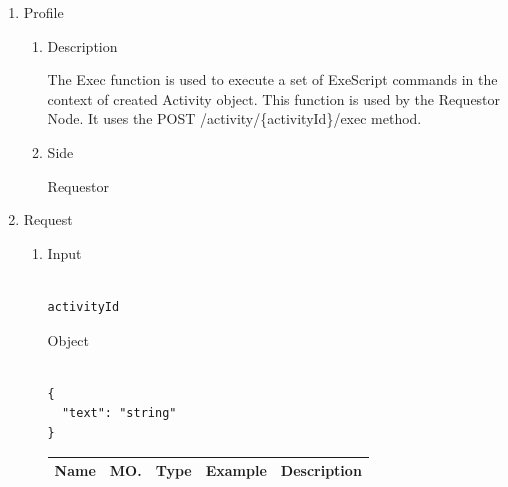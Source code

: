 \newpage


\begin{enumerate}

\item Profile

\begin{enumerate}

\item Description

The Exec function is used to execute a set of ExeScript commands in the context of created Activity object. 
This function is used by the Requestor Node.
It uses the POST /activity/\{activityId\}/exec method. 

\item Side

Requestor

\end{enumerate}

\item Request

\begin{enumerate}

\item Input

\begin{tcolorbox}[boxrule=0pt, frame empty]
\begin{verbatim}

activityId

\end{verbatim}
\end{tcolorbox}

Object

\begin{tcolorbox}[boxrule=0pt, frame empty]
\begin{verbatim}

{
  "text": "string"
}

\end{verbatim}
\end{tcolorbox}

\begin{table}[H]
\footnotesize

\begin{center}
\begin{tabular}{|p{3cm}|l|p{3cm}|p{3cm}|p{4cm}|} 
\hline
\rowcolor{lightgray}	Name	& MO.	& Type	& Example & 	Description \\
\hline


\end{tabular}
\end{center}
\end{table}
\end{enumerate}
\end{enumerate}
